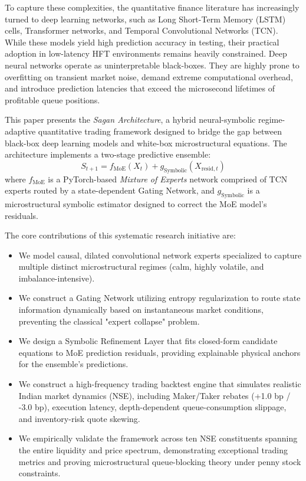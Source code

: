 \documentclass[11pt,a4paper]{article}
\begin{document}
To capture these complexities, the quantitative finance literature has increasingly turned to deep learning networks, such as Long Short-Term Memory (LSTM) cells, Transformer networks, and Temporal Convolutional Networks (TCN). While these models yield high prediction accuracy in testing, their practical adoption in low-latency HFT environments remains heavily constrained. Deep neural networks operate as uninterpretable black-boxes. They are highly prone to overfitting on transient market noise, demand extreme computational overhead, and introduce prediction latencies that exceed the microsecond lifetimes of profitable queue positions.

This paper presents the \textit{Sagan Architecture}, a hybrid neural-symbolic regime-adaptive quantitative trading framework designed to bridge the gap between black-box deep learning models and white-box microstructural equations. The architecture implements a two-stage predictive ensemble:
\begin{equation}
    S_{t+1} = f_{\text{MoE}}(X_t) + g_{\text{Symbolic}}(X_{\text{resid}, t})
\end{equation}
where $f_{\text{MoE}}$ is a PyTorch-based \textit{Mixture of Experts} network comprised of TCN experts routed by a state-dependent Gating Network, and $g_{\text{Symbolic}}$ is a microstructural symbolic estimator designed to correct the MoE model's residuals.

The core contributions of this systematic research initiative are:
\begin{itemize}
    \item We model causal, dilated convolutional network experts specialized to capture multiple distinct microstructural regimes (calm, highly volatile, and imbalance-intensive).
    \item We construct a Gating Network utilizing entropy regularization to route state information dynamically based on instantaneous market conditions, preventing the classical "expert collapse" problem.
    \item We design a Symbolic Refinement Layer that fits closed-form candidate equations to MoE prediction residuals, providing explainable physical anchors for the ensemble's predictions.
    \item We construct a high-frequency trading backtest engine that simulates realistic Indian market dynamics (NSE), including Maker/Taker rebates (+1.0 bp / -3.0 bp), execution latency, depth-dependent queue-consumption slippage, and inventory-risk quote skewing.
    \item We empirically validate the framework across ten NSE constituents spanning the entire liquidity and price spectrum, demonstrating exceptional trading metrics and proving microstructural queue-blocking theory under penny stock constraints.
\end{itemize}
\end{document}
